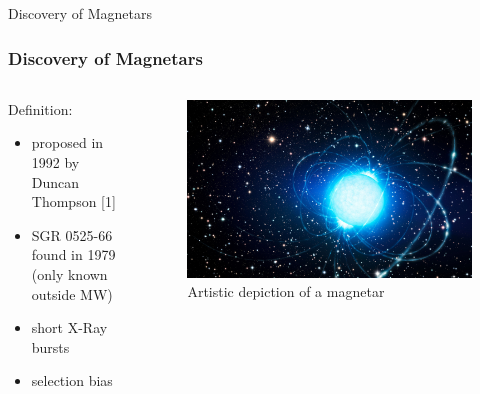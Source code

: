 \documentclass[hyperref=pdftex, presentation]{beamer}
\begin{document}
\begin{frame}{\Large Discovery of Magnetars}
\frametitle{\Large Discovery of Magnetars}

\begin{minipage}[0.2\textheight]{\textwidth}
\begin{columns}[T]
\begin{column}{0.5\textwidth}

\begin{block}{Definition:}

\begin{itemize}
 \item<2-> proposed in 1992 by Duncan Thompson [1]
 \item<3-> SGR 0525-66 found in 1979 (only known outside MW) %
 \item<4-> short X-Ray bursts%
 \item<5-> selection bias 
\end{itemize}
\end{block}

\end{column}
\begin{column}{0.5\textwidth}
	\begin{figure}
		\includegraphics[scale=.09]{figures/magnetar_art.jpg}
		\caption{Artistic depiction of a magnetar}
	\end{figure}
\end{column}
\end{columns}
\end{minipage}

\end{frame}
\end{document}
